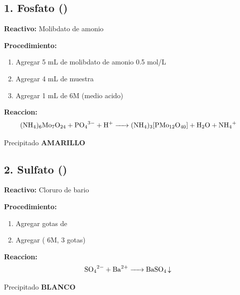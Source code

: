 \documentclass[11pt,a4paper]{article}
\begin{document}
\subsection{1. Fosfato ()}

\textbf{Reactivo:} Molibdato de amonio 

\textbf{Procedimiento:}
\begin{enumerate}[leftmargin=*]
    \item Agregar 5 mL de molibdato de amonio 0.5 mol/L
    \item Agregar 4 mL de muestra
    \item Agregar 1 mL de  6M (medio acido)
\end{enumerate}

\begin{reaccionbox}
\textbf{Reaccion:}
\begin{equation*}
\ce{(NH4)6Mo7O24 + PO4^{3-} + H^+ -> (NH4)3[PMo12O40] + H2O + NH4^+}
\end{equation*}
\end{reaccionbox}

\begin{resultado}
Precipitado \textbf{\textcolor{amarillo!80!black}{AMARILLO}}
\end{resultado}

\subsection{2. Sulfato ()}

\textbf{Reactivo:} Cloruro de bario 

\textbf{Procedimiento:}
\begin{enumerate}[leftmargin=*]
    \item Agregar gotas de 
    \item Agregar  ( 6M, 3 gotas)
\end{enumerate}

\begin{reaccionbox}
\textbf{Reaccion:}
\begin{equation*}
\ce{SO4^{2-} + Ba^{2+} -> BaSO4 v}
\end{equation*}
\end{reaccionbox}

\begin{resultado}
Precipitado \textbf{BLANCO}
\end{resultado}
\end{document}
